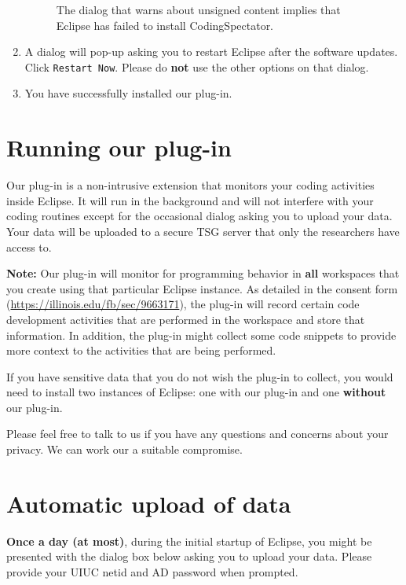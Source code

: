 \documentclass{article}
\newcommand{\fig}[1]{\imgsrc{#1.png}}
\newcommand\fig[1]{\texttt{[image: \#1]}}%
\newcommand\codspec{CodingSpectator}
\newcommand\infonote[1]{\textbf{Note: }#1}
\newcommand\uiref[1]{\texttt{#1}}
\begin{document}
\begin{enumerate}
\begin{figure}
%
\centering
%
\fig{figs/warning}
%
\caption{\label{FigUnsignedWarning}The dialog that warns about unsigned content
implies that Eclipse has failed to install \codspec.}
%
\end{figure}

\item A dialog will pop-up asking you to restart Eclipse after the software
updates. Click \uiref{Restart Now}. Please do \textbf{not} use the other options
on that dialog.

\item You have successfully installed our plug-in.
%
\end{enumerate}
%
\section{Running our plug-in}
%
Our plug-in is a non-intrusive extension that monitors your coding activities
inside Eclipse. It will run in the background and will not interfere with your
coding routines except for the occasional dialog asking you to upload your data.
Your data will be uploaded to a secure TSG server that only the researchers have
access to.

\infonote{Our plug-in will monitor for programming behavior in \textbf{all}
workspaces that you create using that particular Eclipse instance. As detailed
in the consent form (\url{https://illinois.edu/fb/sec/9663171}), the plug-in
will record certain code development activities that are performed in the
workspace and store that information. In addition, the plug-in might collect
some code snippets to provide more context to the activities that are being
performed.

If you have sensitive data that you do not wish the plug-in to collect, you
would need to install two instances of Eclipse: one with our plug-in and one
\textbf{without} our plug-in.

Please feel free to talk to us if you have any questions and concerns about your
privacy. We can work our a suitable compromise.}
%
\section{Automatic upload of data}

\textbf{Once a day (at most)}, during the initial startup of Eclipse, you might
be presented with the dialog box below asking you to upload your data. Please
provide your UIUC netid and AD password when prompted.
\end{document}
